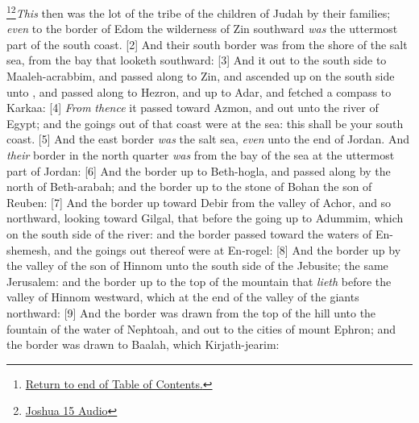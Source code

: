 \footnote{\textcolor[rgb]{0.00,0.25,0.00}{\hyperlink{TOC}{Return to end of Table of Contents.}}}\footnote{\href{https://audiobible.com/bible/joshua_15.html}{\textcolor[cmyk]{0.99998,1,0,0}{Joshua 15 Audio}}}\textcolor[cmyk]{0.99998,1,0,0}{\emph{This} then was the lot of the tribe of the children of Judah by their families; \emph{even} to the border of Edom the wilderness of Zin southward \emph{was} the uttermost part of the south coast.}
[2] \textcolor[cmyk]{0.99998,1,0,0}{And their south border was from the shore of the salt sea, from the bay that looketh southward:}
[3] \textcolor[cmyk]{0.99998,1,0,0}{And it  out to the south side to Maaleh-acrabbim, and passed along to Zin, and ascended up on the south side unto , and passed along to Hezron, and  up to Adar, and fetched a compass to Karkaa:}
[4] \textcolor[cmyk]{0.99998,1,0,0}{\emph{From} \emph{thence} it passed toward Azmon, and  out unto the river of Egypt; and the goings out of that coast were at the sea: this shall be your south coast.}
[5] \textcolor[cmyk]{0.99998,1,0,0}{And the east border \emph{was} the salt sea, \emph{even} unto the end of Jordan. And \emph{their} border in the north quarter \emph{was} from the bay of the sea at the uttermost part of Jordan:}
[6] \textcolor[cmyk]{0.99998,1,0,0}{And the border  up to Beth-hogla, and passed along by the north of Beth-arabah; and the border  up to the stone of Bohan the son of Reuben:}
[7] \textcolor[cmyk]{0.99998,1,0,0}{And the border  up toward Debir from the valley of Achor, and so northward, looking toward Gilgal, that   before the going up to Adummim, which   on the south side of the river: and the border passed toward the waters of En-shemesh, and the goings out thereof were at En-rogel:}
[8] \textcolor[cmyk]{0.99998,1,0,0}{And the border  up by the valley of the son of Hinnom unto the south side of the Jebusite; the same   Jerusalem: and the border  up to the top of the mountain that \emph{lieth} before the valley of Hinnom westward, which   at the end of the valley of the giants northward:}
[9] \textcolor[cmyk]{0.99998,1,0,0}{And the border was drawn from the top of the hill unto the fountain of the water of Nephtoah, and  out to the cities of mount Ephron; and the border was drawn to Baalah, which   Kirjath-jearim:}
